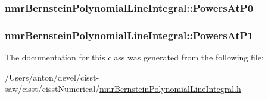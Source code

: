 \subsubsection[{Powers\+At\+P0}]{ nmr\+Bernstein\+Polynomial\+Line\+Integral\+::\+Powers\+At\+P0\hspace{0.3cm}{\ttfamily [protected]}}\label{classnmr_bernstein_polynomial_line_integral_a2afceb5c30ca047d1e04fd5133843f63}
\hypertarget{classnmr_bernstein_polynomial_line_integral_aa7a7f9670060b02df2585e72b9895162}{}
\subsubsection[{Powers\+At\+P1}]{ nmr\+Bernstein\+Polynomial\+Line\+Integral\+::\+Powers\+At\+P1\hspace{0.3cm}{\ttfamily [protected]}}\label{classnmr_bernstein_polynomial_line_integral_aa7a7f9670060b02df2585e72b9895162}


The documentation for this class was generated from the following file\+:\begin{DoxyCompactItemize}
\item 
/\+Users/anton/devel/cisst-\/saw/cisst/cisst\+Numerical/\hyperlink{nmr_bernstein_polynomial_line_integral_8h}{nmr\+Bernstein\+Polynomial\+Line\+Integral.\+h}\end{DoxyCompactItemize}
